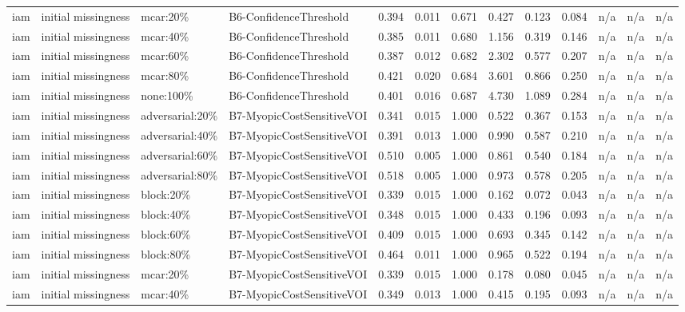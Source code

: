 \begin{table}[!ht]
{\begin{tabular}{lllllllllllll}
iam & initial missingness & mcar:20\% & B6-ConfidenceThreshold & 0.394 & 0.011 & 0.671 & 0.427 & 0.123 & 0.084 & n/a & n/a & n/a \\
iam & initial missingness & mcar:40\% & B6-ConfidenceThreshold & 0.385 & 0.011 & 0.680 & 1.156 & 0.319 & 0.146 & n/a & n/a & n/a \\
iam & initial missingness & mcar:60\% & B6-ConfidenceThreshold & 0.387 & 0.012 & 0.682 & 2.302 & 0.577 & 0.207 & n/a & n/a & n/a \\
iam & initial missingness & mcar:80\% & B6-ConfidenceThreshold & 0.421 & 0.020 & 0.684 & 3.601 & 0.866 & 0.250 & n/a & n/a & n/a \\
iam & initial missingness & none:100\% & B6-ConfidenceThreshold & 0.401 & 0.016 & 0.687 & 4.730 & 1.089 & 0.284 & n/a & n/a & n/a \\
iam & initial missingness & adversarial:20\% & B7-MyopicCostSensitiveVOI & 0.341 & 0.015 & 1.000 & 0.522 & 0.367 & 0.153 & n/a & n/a & n/a \\
iam & initial missingness & adversarial:40\% & B7-MyopicCostSensitiveVOI & 0.391 & 0.013 & 1.000 & 0.990 & 0.587 & 0.210 & n/a & n/a & n/a \\
iam & initial missingness & adversarial:60\% & B7-MyopicCostSensitiveVOI & 0.510 & 0.005 & 1.000 & 0.861 & 0.540 & 0.184 & n/a & n/a & n/a \\
iam & initial missingness & adversarial:80\% & B7-MyopicCostSensitiveVOI & 0.518 & 0.005 & 1.000 & 0.973 & 0.578 & 0.205 & n/a & n/a & n/a \\
iam & initial missingness & block:20\% & B7-MyopicCostSensitiveVOI & 0.339 & 0.015 & 1.000 & 0.162 & 0.072 & 0.043 & n/a & n/a & n/a \\
iam & initial missingness & block:40\% & B7-MyopicCostSensitiveVOI & 0.348 & 0.015 & 1.000 & 0.433 & 0.196 & 0.093 & n/a & n/a & n/a \\
iam & initial missingness & block:60\% & B7-MyopicCostSensitiveVOI & 0.409 & 0.015 & 1.000 & 0.693 & 0.345 & 0.142 & n/a & n/a & n/a \\
iam & initial missingness & block:80\% & B7-MyopicCostSensitiveVOI & 0.464 & 0.011 & 1.000 & 0.965 & 0.522 & 0.194 & n/a & n/a & n/a \\
iam & initial missingness & mcar:20\% & B7-MyopicCostSensitiveVOI & 0.339 & 0.015 & 1.000 & 0.178 & 0.080 & 0.045 & n/a & n/a & n/a \\
iam & initial missingness & mcar:40\% & B7-MyopicCostSensitiveVOI & 0.349 & 0.013 & 1.000 & 0.415 & 0.195 & 0.093 & n/a & n/a & n/a \\

\end{tabular}}
\end{table}
